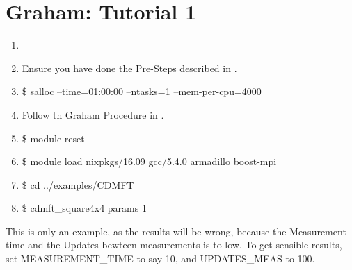\documentclass[letterpaper,10pt,english]{sphinxmanual}
\begin{document}
\section{Graham: Tutorial 1}
\label{\detokenize{tutorial:graham-tutorial-1}}\begin{enumerate}
\item {} 

\item {} 
Ensure you have done the Pre-Steps described in {\hyperref[\detokenize{installation:installation}]{}}.

\item {} 
\$ salloc  --time=01:00:00 --ntasks=1 --mem-per-cpu=4000

\item {} 
Follow th Graham Procedure in {\hyperref[\detokenize{installation:installation}]{}}.

\item {} 
\$ module reset

\item {} 
\$ module load nixpkgs/16.09  gcc/5.4.0 armadillo boost-mpi

\item {} 
\$ cd ../examples/CDMFT

\item {} 
\$ cdmft\_square4x4 params 1

\end{enumerate}

This is  only an example, as the results will be wrong, because the
Measurement time and the Updates bewteen measurements is to low.
To get sensible results, set MEASUREMENT\_TIME to say 10, and UPDATES\_MEAS
to 100.
\end{document}

